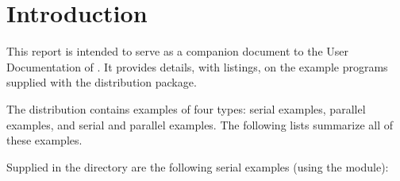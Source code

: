 \section{Introduction}\label{s:ex_intro}

This report is intended to serve as a companion document to the User
Documentation of {\kinsol} \cite{kinsol2.4.0_ug}.  It provides details, with
listings, on the example programs supplied with the {\kinsol} distribution
package.

The {\kinsol} distribution contains examples of four types: serial
{\C} examples, parallel {\C} examples, and serial and parallel {\F}
examples.  The following lists summarize all of these examples.

Supplied in the  directory are the
following serial examples (using the {\nvecs} module):

